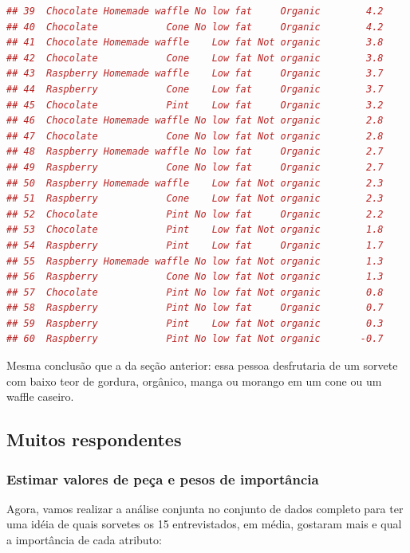 \documentclass{article}
\begin{document}
\begin{lstlisting}[language=R]
## 39  Chocolate Homemade waffle No low fat     Organic        4.2
## 40  Chocolate            Cone No low fat     Organic        4.2
## 41  Chocolate Homemade waffle    Low fat Not organic        3.8
## 42  Chocolate            Cone    Low fat Not organic        3.8
## 43  Raspberry Homemade waffle    Low fat     Organic        3.7
## 44  Raspberry            Cone    Low fat     Organic        3.7
## 45  Chocolate            Pint    Low fat     Organic        3.2
## 46  Chocolate Homemade waffle No low fat Not organic        2.8
## 47  Chocolate            Cone No low fat Not organic        2.8
## 48  Raspberry Homemade waffle No low fat     Organic        2.7
## 49  Raspberry            Cone No low fat     Organic        2.7
## 50  Raspberry Homemade waffle    Low fat Not organic        2.3
## 51  Raspberry            Cone    Low fat Not organic        2.3
## 52  Chocolate            Pint No low fat     Organic        2.2
## 53  Chocolate            Pint    Low fat Not organic        1.8
## 54  Raspberry            Pint    Low fat     Organic        1.7
## 55  Raspberry Homemade waffle No low fat Not organic        1.3
## 56  Raspberry            Cone No low fat Not organic        1.3
## 57  Chocolate            Pint No low fat Not organic        0.8
## 58  Raspberry            Pint No low fat     Organic        0.7
## 59  Raspberry            Pint    Low fat Not organic        0.3
## 60  Raspberry            Pint No low fat Not organic       -0.7
\end{lstlisting}



Mesma conclusão que a da seção anterior: essa pessoa desfrutaria de um sorvete com baixo teor de gordura, orgânico, manga ou morango em um cone ou um waffle caseiro.

\subsection{Muitos respondentes}

\subsubsection{Estimar valores de peça e pesos de importância}

Agora, vamos realizar a análise conjunta no conjunto de dados completo para ter uma idéia de quais sorvetes os 15 entrevistados, em média, gostaram mais e qual a importância de cada atributo:
\end{document}
